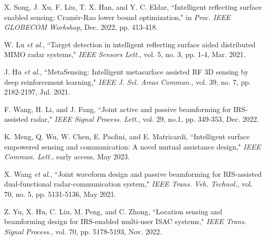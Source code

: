 \documentclass[10pt,final,doublecolumn]{IEEEtran}
\begin{document}
\begin{thebibliography}{1}
%

X. Song, J. Xu, F. Liu, T. X. Han, and Y. C. Eldar, ``Intelligent reflecting surface enabled sensing: Cram\'er-Rao lower bound optimization," in \emph{Proc. IEEE GLOBECOM Workshop}, Dec. 2022, pp. 413-418.

W. Lu \emph{et al}., ``Target detection in intelligent reflecting surface aided distributed MIMO radar systems," \emph{IEEE Sensors Lett.}, vol. 5, no. 3, pp. 1-4, Mar. 2021.

J. Hu \emph{et al}., ``MetaSensing: Intelligent metasurface assisted RF 3D
sensing by deep reinforcement learning," \emph{IEEE J.  Sel.
Areas Commun.}, vol. 39, no. 7, pp. 2182-2197, Jul. 2021.

F. Wang, H. Li, and J. Fang, ``Joint active and passive beamforming for IRS-assisted radar," \emph{IEEE Signal Process. Lett.}, vol. 29, no.1, pp. 349-353, Dec. 2022.



K. Meng, Q. Wu, W. Chen, E. Paolini, and E. Matricardi, ``Intelligent surface empowered sensing and communication: A novel mutual assistance design," \emph{IEEE Commun. Lett.}, early access, May 2023.

X. Wang \emph{et al}., ``Joint waveform design and passive beamforming for RIS-assisted dual-functional radar-communication system," \emph{IEEE Trans. Veh. Technol.}, vol. 70, no. 5, pp. 5131-5136, May 2021.

Z. Yu, X. Hu, C. Liu, M. Peng, and C. Zhong, ``Location sensing and beamforming design for IRS-enabled multi-user ISAC systems," \emph{IEEE Trans. Signal Process.}, vol. 70, pp. 5178-5193, Nov. 2022.


\end{thebibliography}
\end{document}
